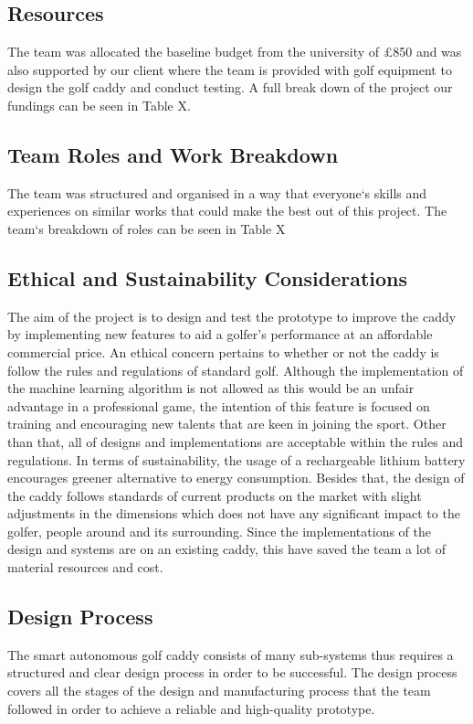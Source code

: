\documentclass[11pt,landscape]{article}
\begin{document}
\begin{multicols}{3}
\subsection{Resources}
The team was allocated the baseline budget from the university of £850 and was
also supported by our client where the team is provided with golf equipment to
design the golf caddy and conduct testing. A full break down of the project our
fundings can be seen in Table X. 

\subsection{Team Roles and Work Breakdown}
The team was structured and organised in a way that everyone`s skills and
experiences on similar works that could make the best out of this project. The
team`s breakdown of roles can be seen in Table X 

\subsection{Ethical and Sustainability Considerations}
The aim of the project is to design and test the prototype to improve the caddy
by implementing new features to aid a golfer’s performance at an affordable
commercial price. An ethical concern pertains to whether or not the caddy is
follow the rules and regulations of standard golf. Although the implementation
of the machine learning algorithm is not allowed as this would be an unfair
advantage in a professional game, the intention of this feature is focused on
training and encouraging new talents that are keen in joining the sport. Other
than that, all of designs and implementations are acceptable within the rules
and regulations. In terms of sustainability, the usage of a rechargeable lithium
battery encourages greener alternative to energy consumption. Besides that, the
design of the caddy follows standards of current products on the market with
slight adjustments in the dimensions which does not have any significant impact
to the golfer, people around and its surrounding. Since the implementations of
the design and systems are on an existing caddy, this have saved the team a lot
of material resources and cost.  

\subsection{Design Process}
The smart autonomous golf caddy consists of many sub-systems thus requires a
structured and clear design process in order to be successful. The design
process covers all the stages of the design and manufacturing process that the
team followed in order to achieve a reliable and high-quality prototype.


\end{multicols}
\end{document}
